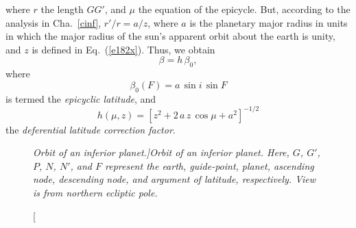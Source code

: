 where $r$ the length $GG'$, and $\mu$ the
equation of the epicycle. But, according to the analysis in Cha.~\ref{cinf}, $r'/r = a/z$, where $a$ is the planetary
major radius in units in which the major radius of the sun's apparent orbit
about the earth is unity, and $z$ is defined in Eq.~(\ref{e182x}).
Thus, we obtain
\begin{equation}
\beta =h\,\beta_0,
\end{equation}
where
\begin{equation}
\beta_0(F) = a\,\sin i\,\sin F
\end{equation}
is termed the {\em epicyclic latitude},
and
\begin{equation}
h(\mu,z) = \left[z^2 + 2\,a\,z\,\cos\mu+ a^2\right]^{-1/2}
\end{equation}
the {\em deferential latitude correction factor}.

\begin{figure}[h]
\epsfysize=3in
\centerline{}
\caption[\em Orbit of an inferior planet.]{\em Orbit of an inferior planet. Here, $G$, $G'$, $P$, 
$N$, $N'$,  and $F$ represent the earth, guide-point,
planet, ascending node, descending node, and argument of latitude, respectively. View is from northern
ecliptic pole.}\label{flong1}
\end{figure}

